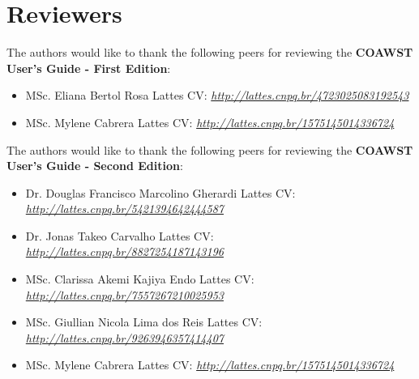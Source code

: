 \chapter*{Reviewers}

\bigskip
 The authors would like to thank the following peers for reviewing the \textbf{COAWST User's Guide  - First Edition}:
\bigskip

\begin{itemize}
    \item MSc. Eliana Bertol Rosa \newline Lattes CV: \textit{\textcolor{bleu_cite}{\href{http://lattes.cnpq.br/4723025083192543}{http://lattes.cnpq.br/4723025083192543}}}
    \bigskip
    \item MSc. Mylene Cabrera \newline Lattes CV: \textit{\textcolor{bleu_cite}{\href{http://lattes.cnpq.br/1575145014336724}{http://lattes.cnpq.br/1575145014336724}}}
\end{itemize}

\bigskip
\bigskip
 The authors would like to thank the following peers for reviewing the \textbf{COAWST User's Guide - Second Edition}:
\bigskip

\begin{itemize}
    \item Dr. Douglas Francisco Marcolino Gherardi \newline Lattes CV: \textit{\textcolor{bleu_cite}{\href{http://lattes.cnpq.br/5421394642444587}{http://lattes.cnpq.br/5421394642444587}}}
    \bigskip
    \item Dr. Jonas Takeo Carvalho \newline Lattes CV: \textit{\textcolor{bleu_cite}{\href{http://lattes.cnpq.br/8827254187143196}{http://lattes.cnpq.br/8827254187143196}}}
    \bigskip
    \item MSc. Clarissa Akemi Kajiya Endo \newline Lattes CV: \textit{\textcolor{bleu_cite}{\href{http://lattes.cnpq.br/7557267210025953}{http://lattes.cnpq.br/7557267210025953}}}
    \bigskip
    \item MSc. Giullian Nicola Lima dos Reis \newline Lattes CV: \textit{\textcolor{bleu_cite}{\href{http://lattes.cnpq.br/9263946357414407}{http://lattes.cnpq.br/9263946357414407}}}
    \bigskip
    \item MSc. Mylene Cabrera \newline Lattes CV: \textit{\textcolor{bleu_cite}{\href{http://lattes.cnpq.br/1575145014336724}{http://lattes.cnpq.br/1575145014336724}}}
\end{itemize}
\newpage

